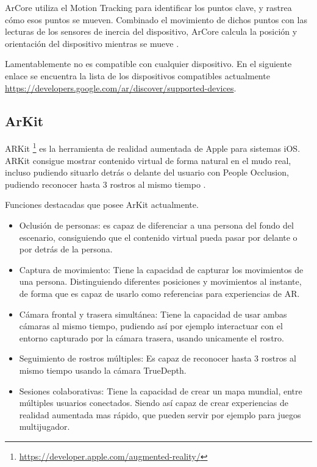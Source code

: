 ArCore utiliza el Motion Tracking para identificar los puntos clave, y rastrea cómo esos puntos se mueven. Combinado el movimiento de dichos puntos con  las lecturas de los sensores de inercia del dispositivo, ArCore calcula la posición y orientación del dispositivo mientras se mueve \cite{google}.

Lamentablemente no es compatible con cualquier dispositivo. En el siguiente enlace se encuentra la lista de los dispositivos compatibles actualmente \url{https://developers.google.com/ar/discover/supported-devices}.

\subsection{ArKit}
ARKit \footnote{\url{https://developer.apple.com/augmented-reality/}} es la herramienta de realidad aumentada de Apple para sistemas iOS. ARKit consigue mostrar contenido virtual de forma natural en el mudo real, incluso pudiendo situarlo detrás o delante del usuario con People Occlusion, pudiendo reconocer hasta 3 rostros al mismo tiempo \cite{apple_inc}.

Funciones destacadas que posee ArKit actualmente.
\begin{itemize}
	\item Oclusión de personas: es capaz de diferenciar a una persona del fondo del escenario, consiguiendo que el contenido virtual  pueda pasar por delante o por detrás de la persona.
	\item Captura de movimiento: Tiene la capacidad de capturar los movimientos de una persona. Distinguiendo diferentes posiciones y movimientos al instante, de forma que es capaz de usarlo como referencias para experiencias de AR.
	\item Cámara frontal y trasera simultánea: Tiene la capacidad de usar ambas cámaras al mismo tiempo, pudiendo así por ejemplo interactuar con el entorno capturado por la cámara trasera, usando unicamente el rostro.
	\item Seguimiento de rostros múltiples: Es capaz de reconocer hasta 3 rostros al mismo tiempo usando la cámara TrueDepth.
	\item Sesiones colaborativas: Tiene la capacidad de crear un mapa mundial, entre múltiples usuarios conectados. Siendo así capaz de crear experiencias de realidad aumentada mas rápido, que pueden servir por ejemplo para juegos multijugador.
\end{itemize}




